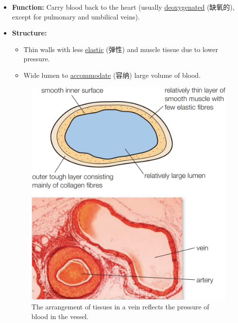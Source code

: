 \begin{itemize}
    \begin{itemize}
        \item \textbf{Function:} Carry blood back to the heart (usually \underline{deoxygenated} (缺氧的), except for pulmonary
        and umbilical veins).
        \item \textbf{Structure:}
        \begin{itemize}
            \item Thin walls with less \underline{elastic} (弹性) and muscle tissue due to lower pressure.
            \item Wide lumen to \underline{accommodate} (容纳) large volume of blood.
        \end{itemize}
        \begin{figure}[H]
            \centering
            \includegraphics[scale=0.15]{Biology/1B/Images/1B-3-4.png}
            \caption{The arrangement of tissues in a vein reflects the pressure of blood in the vessel.}
        \end{figure}
    \end{itemize}
\end{itemize}

